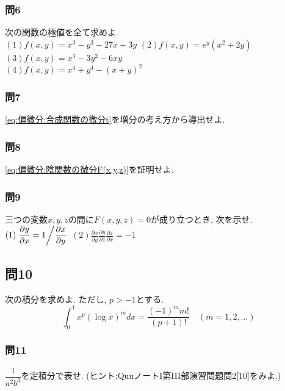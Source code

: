 \documentclass[a4j,dvipdfmx]{jsarticle}
\numberwithin{equation}{section}
\begin{document}
        \subsubsection*{問6}次の関数の極値を全て求めよ.\\
            $(1)f(x,y)=x^3-y^3-27x+3y$\hspace{1mm}
            $(2)f(x,y)=e^{y}(x^2+2y)$\hspace{1mm}
            $(3)f(x,y)=x^3-3y^2-6xy$\\
            $(4)f(x,y)=x^4+y^4-(x+y)^2$

        \subsubsection*{問7}\eqref{eq:偏微分:合成関数の微分t}を増分の考え方から導出せよ.

        \subsubsection*{問8}\eqref{eq:偏微分:陰関数の微分F(x,y,z)}を証明せよ.
        \clearpage
        \thispagestyle{fancy}\rhead{\thepage}\cfoot{}
        \subsubsection*{問9}三つの変数$x,y,z$の間に$F(x,y,z)=0$が成り立つとき, 次を示せ.\\
        $(1)\displaystyle \left.\frac{\partial y}{\partial x}=1\middle/ \frac{\partial x}{\partial y}\right.$\hspace{20mm}
        $(2)\displaystyle \frac{\partial x}{\partial y}\frac{\partial y}{\partial z}\frac{\partial z}{\partial x} = -1$

        \subsection*{問10}次の積分を求めよ. ただし, $p>-1$とする.
        \begin{equation*}
            \int_{0}^{1}x^p(\log x)^mdx=\frac{(-1)^mm!}{(p+1)!}\quad (m=1,2,\dots)
        \end{equation*}
        
        \subsubsection*{問11} $\dfrac{1}{a^2b^3}$を定積分で表せ. ({\footnotesize ヒント:QuuノートI第III部演習問題問2[10]をみよ.})
    \clearpage
\end{document}
